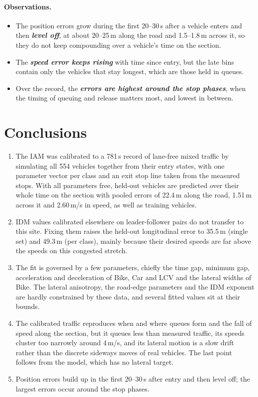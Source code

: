 \documentclass[11pt]{article}
\newcommand{\key}[1]{\textbf{\textit{#1}}}
\begin{document}
\paragraph{Observations.}
\begin{itemize}\setlength{\itemsep}{1pt}
\item The position errors grow during the first 20--30\,s after a vehicle
enters and then \key{level off}, at about 20--25\,m along the road and
1.5--1.8\,m across it, so they do not keep compounding over a vehicle's time on
the section.
\item The \key{speed error keeps rising} with time since entry, but the late bins
contain only the vehicles that stay longest, which are those held in queues.
\item Over the record, the \key{errors are highest around the stop phases}, when
the timing of queuing and release matters most, and lowest in between.
\end{itemize}

\section{Conclusions}
\label{sec:concl}
\begin{enumerate}\setlength{\itemsep}{2pt}
\item The IAM was calibrated to a 781\,s record of lane-free mixed traffic by
simulating all 554 vehicles together from their entry states, with one
parameter vector per class and an exit stop line taken from the measured stops.
With all parameters free, held-out vehicles are predicted over their whole time
on the section with pooled errors of 22.4\,m along the road, 1.51\,m across it
and 2.60\,m/s in speed, as well as training vehicles.
\item IDM values calibrated elsewhere on leader-follower pairs do not transfer
to this site. Fixing them raises the held-out longitudinal error to 35.5\,m
(single set) and 49.3\,m (per class), mainly because their desired speeds are
far above the speeds on this congested stretch.
\item The fit is governed by a few parameters, chiefly the time gap, minimum
gap, acceleration and deceleration of Bike, Car and LCV and the lateral widths
of Bike. The lateral anisotropy, the road-edge parameters and the IDM exponent
are hardly constrained by these data, and several fitted values sit at their
bounds.
\item The calibrated traffic reproduces when and where queues form and the
fall of speed along the section, but it queues less than measured traffic, its
speeds cluster too narrowly around 4\,m/s, and its lateral motion is a slow
drift rather than the discrete sideways moves of real vehicles. The last point
follows from the model, which has no lateral target.
\item Position errors build up in the first 20--30\,s after entry and then
level off; the largest errors occur around the stop phases.
\end{enumerate}
\end{document}
